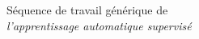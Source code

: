 

\begin{frame}{\vskip -0.5cm \normalsize S\'equence de travail g\'en\'erique de\\ \textit{\Large l'apprentissage automatique supervis\'e}}

\vskip -0.2cm


\end{frame}
\normalsize

